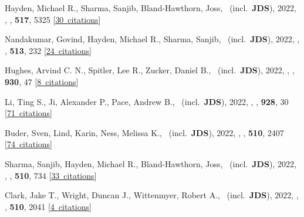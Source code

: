 \item[{\color{numcolor}\scriptsize74}] Hayden, Michael R., Sharma, Sanjib, Bland-Hawthorn, Joss, \etal\ (incl.\ \textbf{JDS}), 2022, , \mnras, \textbf{517}, 5325 [\href{https://ui.adsabs.harvard.edu/#abs/2022MNRAS.517.5325H}{30~citations}]

\item[{\color{numcolor}\scriptsize73}] Nandakumar, Govind, Hayden, Michael R., Sharma, Sanjib, \etal\ (incl.\ \textbf{JDS}), 2022, , \mnras, \textbf{513}, 232 [\href{https://ui.adsabs.harvard.edu/#abs/2022MNRAS.513..232N}{24~citations}]

\item[{\color{numcolor}\scriptsize72}] Hughes, Arvind C. N., Spitler, Lee R., Zucker, Daniel B., \etal\ (incl.\ \textbf{JDS}), 2022, , \apj, \textbf{930}, 47 [\href{https://ui.adsabs.harvard.edu/#abs/2022ApJ...930...47H}{8~citations}]

\item[{\color{numcolor}\scriptsize71}] Li, Ting S., Ji, Alexander P., Pace, Andrew B., \etal\ (incl.\ \textbf{JDS}), 2022, , \apj, \textbf{928}, 30 [\href{https://ui.adsabs.harvard.edu/#abs/2022ApJ...928...30L}{71~citations}]

\item[{\color{numcolor}\scriptsize70}] Buder, Sven, Lind, Karin, Ness, Melissa K., \etal\ (incl.\ \textbf{JDS}), 2022, , \mnras, \textbf{510}, 2407 [\href{https://ui.adsabs.harvard.edu/#abs/2022MNRAS.510.2407B}{74~citations}]

\item[{\color{numcolor}\scriptsize69}] Sharma, Sanjib, Hayden, Michael R., Bland-Hawthorn, Joss, \etal\ (incl.\ \textbf{JDS}), 2022, , \mnras, \textbf{510}, 734 [\href{https://ui.adsabs.harvard.edu/#abs/2022MNRAS.510..734S}{33~citations}]

\item[{\color{numcolor}\scriptsize68}] Clark, Jake T., Wright, Duncan J., Wittenmyer, Robert A., \etal\ (incl.\ \textbf{JDS}), 2022, , \mnras, \textbf{510}, 2041 [\href{https://ui.adsabs.harvard.edu/#abs/2022MNRAS.510.2041C}{4~citations}]

